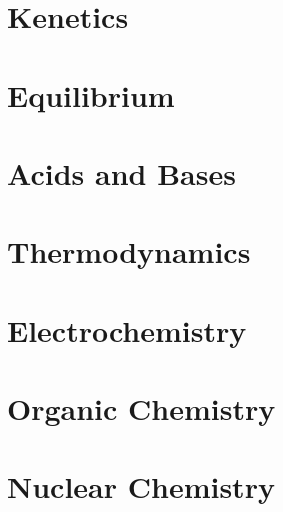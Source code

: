 \documentclass[11pt]{article}
\begin{document}
\section{Kenetics}
\label{sec:org70302c2}
\section{Equilibrium}
\label{sec:org5c65c97}
\section{Acids and Bases}
\label{sec:org4cd76f3}
\section{Thermodynamics}
\label{sec:orga8425e2}
\section{Electrochemistry}
\label{sec:org1f3b228}
\section{Organic Chemistry}
\label{sec:org5ab9d2e}
\section{Nuclear Chemistry}
\label{sec:org681ee66}
\end{document}
